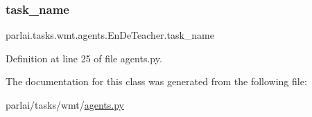 \subsubsection{\texorpdfstring{task\+\_\+name}{task\_name}}
{\footnotesize\ttfamily parlai.\+tasks.\+wmt.\+agents.\+En\+De\+Teacher.\+task\+\_\+name}



Definition at line 25 of file agents.\+py.



The documentation for this class was generated from the following file\+:\begin{DoxyCompactItemize}
\item 
parlai/tasks/wmt/\hyperlink{parlai_2tasks_2wmt_2agents_8py}{agents.\+py}\end{DoxyCompactItemize}
